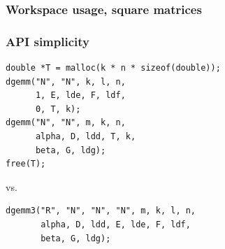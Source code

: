 \documentclass{beamer}
\begin{document}
\begin{frame}
  \frametitle{Workspace usage, square matrices}
\end{frame}

\begin{frame}
  \frametitle{API simplicity}
\begin{verbatim}
double *T = malloc(k * n * sizeof(double));
dgemm("N", "N", k, l, n,
      1, E, lde, F, ldf,
      0, T, k);
dgemm("N", "N", m, k, n,
      alpha, D, ldd, T, k,
      beta, G, ldg);
free(T);
\end{verbatim}
  vs.
\begin{verbatim}
dgemm3("R", "N", "N", "N", m, k, l, n,
       alpha, D, ldd, E, lde, F, ldf,
       beta, G, ldg);
\end{verbatim}
\end{frame}
\end{document}
